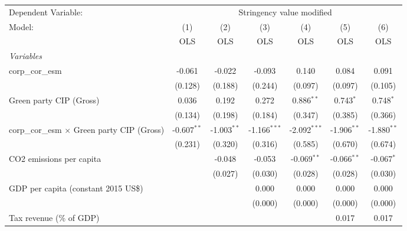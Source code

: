 
\begingroup
\centering
\begin{tabular}{lcccccc}
   \toprule
   Dependent Variable: & \multicolumn{6}{c}{Stringency value modified}\\
   Model:                                             & (1)           & (2)           & (3)            & (4)            & (5)           & (6)\\  
                                                      &  OLS          & OLS           & OLS            & OLS            & OLS           & OLS\\  
   \midrule
   \emph{Variables}\\
   corp\_cor\_esm                                     & -0.061        & -0.022        & -0.093         & 0.140          & 0.084         & 0.091\\   
                                                      & (0.128)       & (0.188)       & (0.244)        & (0.097)        & (0.097)       & (0.105)\\   
   Green party CIP (Gross)                            & 0.036         & 0.192         & 0.272          & 0.886$^{**}$   & 0.743$^{*}$   & 0.748$^{*}$\\   
                                                      & (0.134)       & (0.198)       & (0.184)        & (0.347)        & (0.385)       & (0.366)\\   
   corp\_cor\_esm $\times$ Green party CIP (Gross)    & -0.607$^{**}$ & -1.003$^{**}$ & -1.166$^{***}$ & -2.092$^{***}$ & -1.906$^{**}$ & -1.880$^{**}$\\   
                                                      & (0.231)       & (0.320)       & (0.316)        & (0.585)        & (0.670)       & (0.674)\\   
   CO2 emissions per capita                           &               & -0.048        & -0.053         & -0.069$^{**}$  & -0.066$^{**}$ & -0.067$^{*}$\\   
                                                      &               & (0.027)       & (0.030)        & (0.028)        & (0.028)       & (0.030)\\   
   GDP per capita (constant 2015 US\$)                &               &               & 0.000          & 0.000          & 0.000         & 0.000\\   
                                                      &               &               & (0.000)        & (0.000)        & (0.000)       & (0.000)\\   
   Tax revenue (\% of GDP)                            &               &               &                &                & 0.017         & 0.017\\   

\end{tabular}
